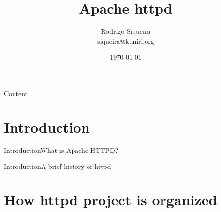 \documentclass[10pt]{beamer}
\title[] %
{ %
      \textbf{Apache httpd}
}
\subtitle[Managements]
{
}
\author[Rodrigo Siqueira]
{      Rodrigo Siqueira\\
      {\ttfamily siqueira@kuniri.org}
}
\institute[]
{
      Institute of Mathematics and Statistics\\
      University of Sao Paulo\\

}
\date{\today}
\begin{document}

{\1%
\begin{frame}
  \titlepage %
\end{frame}}

\begin{frame}[shrink]{Content}{}
  \tableofcontents
\end{frame}

\section{Introduction}
\begin{frame}{Introduction}{What is Apache HTTPD?}
  
\end{frame}

\begin{frame}{Introduction}{A brief history of httpd}
\end{frame}

\section{How httpd project is organized}

\end{document}

